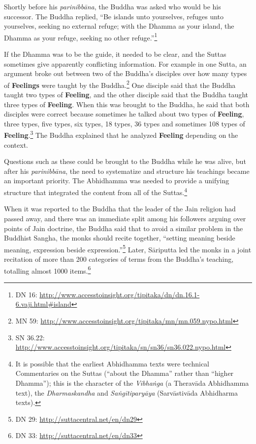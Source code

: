 Shortly before his \textit{parinibbāna}, the Buddha was asked who would be his successor. The Buddha replied, “Be islands unto yourselves, refuges unto yourselves, seeking no external refuge; with the Dhamma as your island, the Dhamma as your refuge, seeking no other refuge.”\footnote{DN 16: \url{http://www.accesstoinsight.org/tipitaka/dn/dn.16.1-6.vaji.html\#island}}

If the Dhamma was to be the guide, it needed to be clear, and the Suttas sometimes give apparently conflicting information. For example in one Sutta, an argument broke out between two of the Buddha’s disciples over how many types of \textbf{Feelings} were taught by the Buddha.\footnote{MN 59: \url{http://www.accesstoinsight.org/tipitaka/mn/mn.059.nypo.html}} One disciple said that the Buddha taught two types of \textbf{Feeling}, and the other disciple said that the Buddha taught three types of \textbf{Feeling}. When this was brought to the Buddha, he said that both disciples were correct because sometimes he talked about two types of \textbf{Feeling}, three types, five types, six types, 18 types, 36 types and sometimes 108 types of \textbf{Feeling}.\footnote{SN 36.22: \url{http://www.accesstoinsight.org/tipitaka/sn/sn36/sn36.022.nypo.html}} The Buddha explained that he analyzed \textbf{Feeling} depending on the context.

Questions such as these could be brought to the Buddha while he was alive, but after his \textit{parinibbāna}, the need to systematize and structure his teachings became an important priority. The Abhidhamma was needed to provide a unifying structure that integrated the content from all of the Suttas.\footnote{It is possible that the earliest Abhidhamma texts were technical Commentaries on the Suttas (“about the Dhamma” rather than “higher Dhamma”); this is the character of the \textit{Vibhaṅga} (a Theravāda Abhidhamma text), the \textit{Dharmaskandha} and \textit{Saṅgītiparyāya} (Sarvāstivāda Abhidharma texts).}

\pagebreak

When it was reported to the Buddha that the leader of the Jain religion had passed away, and there was an immediate split among his followers arguing over points of Jain doctrine, the Buddha said that to avoid a similar problem in the Buddhist Sangha, the monks should recite together, “setting meaning beside meaning, expression beside expression.”\footnote{DN 29: \url{http://suttacentral.net/en/dn29}} Later, Sāriputta led the monks in a joint recitation of more than 200 categories of terms from the Buddha’s teaching, totalling almost 1000 items.\footnote{DN 33: \url{http://suttacentral.net/en/dn33}}


